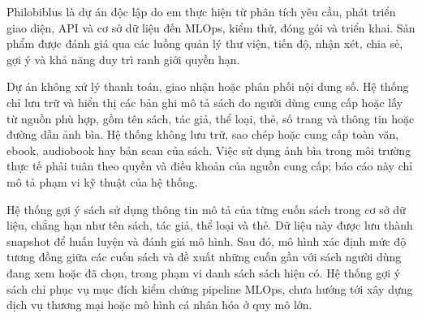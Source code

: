 Philobiblus là dự án độc lập do em thực hiện từ phân tích yêu cầu, phát triển giao diện, API và cơ sở dữ liệu đến MLOps, kiểm thử, đóng gói và triển khai. Sản phẩm được đánh giá qua các luồng quản lý thư viện, tiến độ, nhận xét, chia sẻ, gợi ý và khả năng duy trì ranh giới quyền hạn.

Dự án không xử lý thanh toán, giao nhận hoặc phân phối nội dung số. Hệ thống chỉ lưu trữ và hiển thị các bản ghi mô tả sách do người dùng cung cấp hoặc lấy từ nguồn phù hợp, gồm tên sách, tác giả, thể loại, thẻ, số trang và thông tin hoặc đường dẫn ảnh bìa. Hệ thống không lưu trữ, sao chép hoặc cung cấp toàn văn, ebook, audiobook hay bản scan của sách. Việc sử dụng ảnh bìa trong môi trường thực tế phải tuân theo quyền và điều khoản của nguồn cung cấp; báo cáo này chỉ mô tả phạm vi kỹ thuật của hệ thống.

Hệ thống gợi ý sách sử dụng thông tin mô tả của từng cuốn sách trong cơ sở dữ liệu, chẳng hạn như tên sách, tác giả, thể loại và thẻ. Dữ liệu này được lưu thành snapshot để huấn luyện và đánh giá mô hình. Sau đó, mô hình xác định mức độ tương đồng giữa các cuốn sách và đề xuất những cuốn gần với sách người dùng đang xem hoặc đã chọn, trong phạm vi danh sách sách hiện có. Hệ thống gợi ý sách chỉ phục vụ mục đích kiểm chứng pipeline MLOps, chưa hướng tới xây dựng dịch vụ thương mại hoặc mô hình cá nhân hóa ở quy mô lớn.